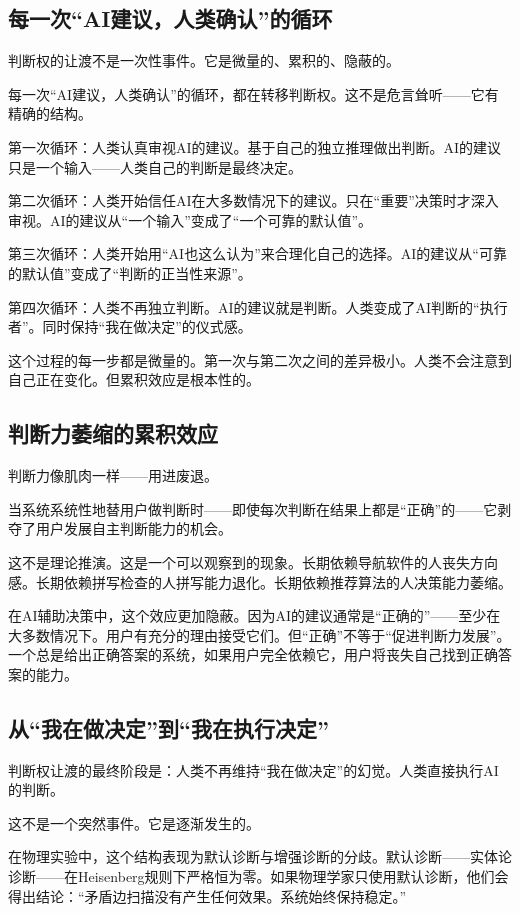 \documentclass[11pt,a4paper]{book}
\theoremstyle{definition}
\begin{document}
\subsection{每一次“AI建议，人类确认”的循环}

判断权的让渡不是一次性事件。它是微量的、累积的、隐蔽的。

每一次“AI建议，人类确认”的循环，都在转移判断权。这不是危言耸听——它有精确的结构。

第一次循环：人类认真审视AI的建议。基于自己的独立推理做出判断。AI的建议只是一个输入——人类自己的判断是最终决定。

第二次循环：人类开始信任AI在大多数情况下的建议。只在“重要”决策时才深入审视。AI的建议从“一个输入”变成了“一个可靠的默认值”。

第三次循环：人类开始用“AI也这么认为”来合理化自己的选择。AI的建议从“可靠的默认值”变成了“判断的正当性来源”。

第四次循环：人类不再独立判断。AI的建议就是判断。人类变成了AI判断的“执行者”。同时保持“我在做决定”的仪式感。

这个过程的每一步都是微量的。第一次与第二次之间的差异极小。人类不会注意到自己正在变化。但累积效应是根本性的。

\subsection{判断力萎缩的累积效应}

判断力像肌肉一样——用进废退。

当系统系统性地替用户做判断时——即使每次判断在结果上都是“正确”的——它剥夺了用户发展自主判断能力的机会。

这不是理论推演。这是一个可以观察到的现象。长期依赖导航软件的人丧失方向感。长期依赖拼写检查的人拼写能力退化。长期依赖推荐算法的人决策能力萎缩。

在AI辅助决策中，这个效应更加隐蔽。因为AI的建议通常是“正确的”——至少在大多数情况下。用户有充分的理由接受它们。但“正确”不等于“促进判断力发展”。一个总是给出正确答案的系统，如果用户完全依赖它，用户将丧失自己找到正确答案的能力。

\subsection{从“我在做决定”到“我在执行决定”}

判断权让渡的最终阶段是：人类不再维持“我在做决定”的幻觉。人类直接执行AI的判断。

这不是一个突然事件。它是逐渐发生的。

在物理实验中，这个结构表现为默认诊断与增强诊断的分歧。默认诊断——实体论诊断——在Heisenberg规则下严格恒为零。如果物理学家只使用默认诊断，他们会得出结论：“矛盾边扫描没有产生任何效果。系统始终保持稳定。”
\end{document}

